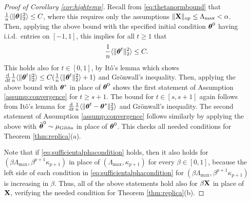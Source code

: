 \begin{proof}[Proof of Corollary \ref{cor:hightemp}]
Recall from \eqref{eq:thetanormbound} that $\frac{1}{n}\langle\|\boldsymbol{\theta}\|_2^2\rangle \leq C$, where this requires only the assumptions $\|\mathbf{X}\|_{\mathrm{op}} \leq \Lambda_{\max}<\alpha$. Then,
applying the above bound with the specified initial condition $\boldsymbol{\theta}^0$ having i.i.d.\ entries on $[-1,1]$, this implies for all $t \geq 1$ that
\[\frac{1}{n}\langle \|\boldsymbol{\theta}^t\|_2^2 \rangle \leq C.\]
This holds also for $t \in [0,1]$, by It\^o's lemma which shows $\frac{\mathrm{d}}{\mathrm{d} t}\frac{1}{n}\langle \|\boldsymbol{\theta}^t\|_2^2 \rangle \leq C(\frac{1}{n}\langle \|\boldsymbol{\theta}^t\|_2^2 \rangle +1)$ and Gr\"onwall's inequality. Then, applying the above bound with
$\boldsymbol{\theta}^s$ in place of $\boldsymbol{\theta}^0$
shows the first statement of Assumption \ref{assump:convergence} for $t \geq s+1$.
The bound for $t \in [s,s+1]$ again follows from It\^o's lemma for $\frac{\mathrm{d}}{\mathrm{d} t}\frac{1}{n}\langle \|\boldsymbol{\theta}^t-\boldsymbol{\theta}^s\|_2^2 \rangle$ and Gr\"onwall's inequality. The second statement of
Assumption \ref{assump:convergence} follows similarly by applying the above with $\tilde{\boldsymbol{\theta}}^0 \sim \mu_{\mathrm{Gibbs}}$ in place of $\boldsymbol{\theta}^0$.
This checks all needed conditions for Theorem \ref{thm:replica}(a).

Note that if \eqref{eq:sufficientalphacondition}
holds, then it also holds for $(\beta\Lambda_{\max},\beta^{p+1}\kappa_{p+1})$ in
place of $(\Lambda_{\max},\kappa_{p+1})$ for every $\beta \in [0,1]$, because
the left side of each condition in \eqref{eq:sufficientalphacondition}
for $(\beta\Lambda_{\max},\beta^{p+1}\kappa_{p+1})$ is increasing
in $\beta$. Thus, all of the above statements hold also for $\beta\mathbf{X}$ in place
of $\mathbf{X}$, verifying the needed condition for Theorem \ref{thm:replica}(b).
\end{proof}

